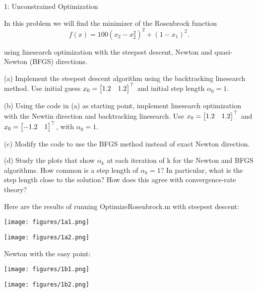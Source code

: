 
\begin{problem}{1: Unconstrained Optimization}

  In this problem we will find the minimizer of the Rosenbrock function
  \[
    f(x) = 100(x_2 - x_2^2)^2 + (1-x_1)^2
  .\] 

  using linesearch optimization with the steepest descent, Newton and quasi-Newton (BFGS) directions. 
  
  \medskip (a) Implement the steepest descent algorithm using the backtracking linesearch method. Use initial guess $x_0 = \begin{bmatrix} 1.2 & 1.2 \end{bmatrix}^{\top}$ and initial step length $\alpha_0 = 1$.
  
  \medskip (b) Using the code in (a) as starting point, implement linesearch optimization with the Newtin direction 
  and backtracking linesearch. Use $x_0 = \begin{bmatrix} 1.2 & 1.2 \end{bmatrix}^{\top}$ and $x_0 = \begin{bmatrix} -1.2 & 1 \end{bmatrix}^{\top}$, with $\alpha_0 = 1$. 
  
  \medskip (c) Modify the code to use the BFGS method instead of exact Newton direction. 
  
  \medskip (d) Study the plots that show $\alpha_k$ at each iteration of k for the Newton and BFGS algorithms. 
  How common is a step length of $\alpha_k = 1$? In particular, what is the step length close to the solution? How does
  this agree with convergence-rate theory?

\end{problem}



Here are the results of running OptimizeRosenbrock.m with steepest descent: 

\begin{minipage}[c]{0.5\textwidth}
  \centering
  \texttt{[image: figures/1a1.png]}
\end{minipage}
\hfill
\begin{minipage}[c]{0.5\textwidth}
  \centering
  \texttt{[image: figures/1a2.png]}
\end{minipage}


Newton with the easy point: 

\begin{minipage}[c]{0.5\textwidth}
  \centering
  \texttt{[image: figures/1b1.png]}
\end{minipage}
\hfill
\begin{minipage}[c]{0.5\textwidth}
  \centering
  \texttt{[image: figures/1b2.png]}
\end{minipage}

